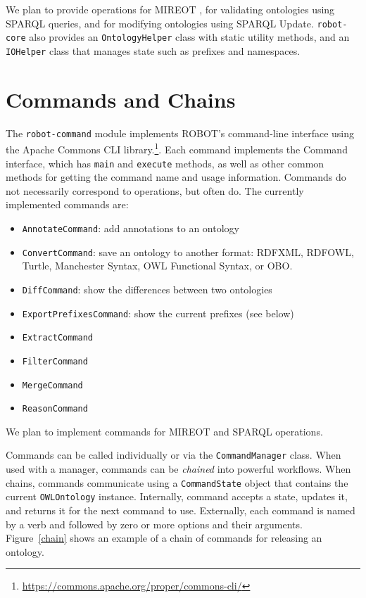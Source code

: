 \documentclass{icbo}
\begin{document}
We plan to provide operations for MIREOT \citep{Courtot2011}, for validating ontologies using SPARQL queries, and for modifying ontologies using SPARQL Update. {\tt robot-core} also provides an {\tt OntologyHelper} class with static utility methods, and an {\tt IOHelper} class that manages state such as prefixes and namespaces.


\section{Commands and Chains}

The {\tt robot-command} module implements ROBOT's command-line interface using the Apache Commons CLI library.\footnote{\url{https://commons.apache.org/proper/commons-cli/}}. Each command implements the Command interface, which has {\tt main} and {\tt execute} methods, as well as other common methods for getting the command name and usage information. Commands do not necessarily correspond to operations, but often do. The currently implemented commands are:

\begin{itemize}
  \item {\tt AnnotateCommand}: add annotations to an ontology
  \item {\tt ConvertCommand}: save an ontology to another format: RDFXML, RDFOWL, Turtle, Manchester Syntax, OWL Functional Syntax, or OBO.
  \item {\tt DiffCommand}: show the differences between two ontologies
  \item {\tt ExportPrefixesCommand}: show the current prefixes (see below)
  \item {\tt ExtractCommand}
  \item {\tt FilterCommand}
  \item {\tt MergeCommand}
  \item {\tt ReasonCommand}
\end{itemize}

We plan to implement commands for MIREOT and SPARQL operations.

Commands can be called individually or via the {\tt CommandManager} class. When used with a manager, commands can be {\it chained} into powerful workflows. When chains, commands communicate using a {\tt CommandState} object that contains the current {\tt OWLOntology} instance. Internally, command accepts a state, updates it, and returns it for the next command to use. Externally, each command is named by a verb and followed by zero or more options and their arguments. Figure~\ref{chain} shows an example of a chain of commands for releasing an ontology.
\end{document}
